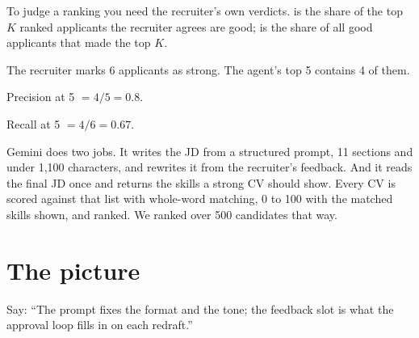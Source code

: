 \begin{definition}[Precision at K]
To judge a ranking you need the recruiter's own verdicts.  is the share of the top $K$ ranked applicants the recruiter agrees are good;  is the share of all good applicants that made the top $K$.
\end{definition}

\begin{example}
The recruiter marks 6 applicants as strong. The agent's top 5 contains 4 of them.
\begin{steps}
  \item Precision at 5 $= 4/5 = 0.8$.
  \item Recall at 5 $= 4/6 = 0.67$.
\end{steps}
\end{example}

\begin{sayit}
Gemini does two jobs. It writes the JD from a structured prompt, 11 sections and under 1,100 characters, and rewrites it from the recruiter's feedback. And it reads the final JD once and returns the skills a strong CV should show. Every CV is scored against that list with whole-word matching, 0 to 100 with the matched skills shown, and ranked. We ranked over 500 candidates that way.
\end{sayit}

\section{The picture}

\begin{sayit}
\begin{pic}
\end{pic}
Say: ``The prompt fixes the format and the tone; the feedback slot is what the approval loop fills in on each redraft.''
\end{sayit}

